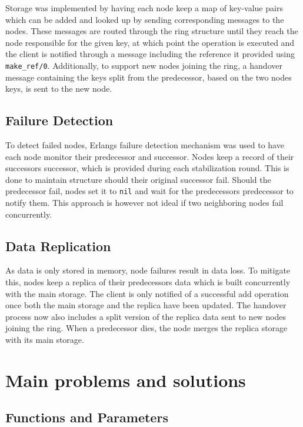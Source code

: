\documentclass[a4paper, 11pt]{article}
\begin{document}
Storage was implemented by having each node keep a map of key-value pairs which can be added and looked up by sending corresponding messages to the nodes.
These messages are routed through the ring structure until they reach the node responsible for the given key,
at which point the operation is executed and the client is notified through a message including the reference it provided using \texttt{make\_ref/0}.
Additionally, to support new nodes joining the ring, a handover message containing the keys split from the predecessor, based on the two nodes keys, is sent to the new node.

\subsection{Failure Detection}

To detect failed nodes, Erlangs failure detection mechanism was used to have each node monitor their predecessor and successor.
Nodes keep a record of their successors successor, which is provided during each stabilization round. This is done to maintain structure should their original successor fail.
Should the predecessor fail, nodes set it to \texttt{nil} and wait for the predecessors predecessor to notify them.
This approach is however not ideal if two neighboring nodes fail concurrently.

\subsection{Data Replication}

As data is only stored in memory, node failures result in data loss. To mitigate this, nodes keep a replica of their predecessors data which is built concurrently with the main storage.
The client is only notified of a successful add operation once both the main storage and the replica have been updated.
The handover process now also includes a split version of the replica data sent to new nodes joining the ring.
When a predecessor dies, the node merges the replica storage with its main storage.

\section{Main problems and solutions}

\subsection{Functions and Parameters}
\end{document}
